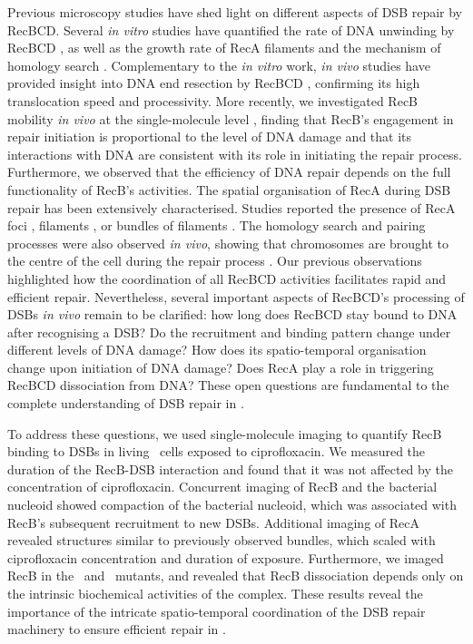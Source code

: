 Previous microscopy studies have shed light on different aspects of DSB repair by RecBCD. Several \emph{in vitro} studies have quantified the rate of DNA unwinding by RecBCD \cite{Spies2003,Liu2013}, as well as the growth rate of RecA filaments \cite{Joo2006,Galletto2006,Handa2009} and the mechanism of homology search \cite{Forget2012,Ragunathan2012}. Complementary to the \emph{in vitro} work, \emph{in vivo} studies have provided insight into DNA end resection by RecBCD \cite{Wiktor2018}, confirming its high translocation speed and processivity. More recently, we investigated RecB mobility \emph{in vivo} at the single-molecule level \cite{Lepore2025}, finding that RecB's engagement in repair initiation is proportional to the level of DNA damage and that its interactions with DNA are consistent with its role in initiating the repair process. Furthermore, we observed that the efficiency of DNA repair depends on the full functionality of RecB’s activities. The spatial organisation of RecA during DSB repair has been extensively characterised. Studies reported the presence of RecA foci \cite{Renzette2005,Renzette2007,Centore2007,Amarh2018}, filaments \cite{Kidane2005}, or bundles of filaments \cite{Lesterlin2013,Ghodke2019}. The homology search and pairing processes were also observed \emph{in vivo}, showing that chromosomes are brought to the centre of the cell during the repair process \cite{Badrinarayanan2015,Wiktor2021}. Our previous observations \cite{Lepore2025} highlighted how the coordination of all RecBCD activities facilitates rapid and efficient repair. Nevertheless, several important aspects of RecBCD's processing of DSBs \emph{in vivo} remain to be clarified: how long does RecBCD stay bound to DNA after recognising a DSB? Do the recruitment and binding pattern change under different levels of DNA damage? How does its spatio-temporal organisation change upon initiation of DNA damage? Does RecA play a role in triggering RecBCD dissociation from DNA? These open questions are fundamental to the complete understanding of DSB repair in \ecoli.

To address these questions, we used single-molecule imaging to quantify RecB binding to DSBs in living \ecoli\ cells exposed to ciprofloxacin. We measured the duration of the RecB-DSB interaction and found that it was not affected by the concentration of ciprofloxacin. Concurrent imaging of RecB and the bacterial nucleoid showed compaction of the bacterial nucleoid, which was associated with RecB's subsequent recruitment to new DSBs. Additional imaging of  RecA revealed structures similar to previously observed bundles, which scaled with ciprofloxacin concentration and duration of exposure. Furthermore, we imaged RecB in the \dreca\ and \geneteneighty\ mutants, and revealed that RecB dissociation depends only on the intrinsic biochemical activities of the complex. These results reveal the importance of the intricate spatio-temporal coordination of the DSB repair machinery to ensure efficient repair in \ecoli.
